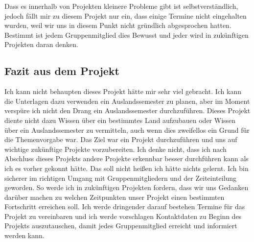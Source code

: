 \documentclass[11pt]{article}
\begin{document}
Dass es innerhalb von Projekten kleinere Probleme gibt ist selbstverständlich, jedoch fällt mir zu diesem Projekt nur ein, dass einige Termine nicht eingehalten wurden, weil wir uns in diesem Punkt nicht gründlich abgesprochen hatten. Bestimmt ist jedem Gruppenmitglied dies Bewusst und jeder wird in zukünftigen Projekten daran denken.



\subsection{Fazit aus dem Projekt}

Ich kann nicht behaupten dieses Projekt hätte mir sehr viel gebracht. Ich kann die Unterlagen dazu verwenden ein Auslandssemester zu planen, aber im Moment verspüre ich nicht den Drang ein Auslandssemester durchzuführen.  
Dieses Projekt diente nicht dazu Wissen über ein bestimmtes Land aufzubauen oder Wissen über ein Auslandssemester zu vermitteln, auch wenn dies zweifellos ein Grund für die Themenvorgabe war. Das Ziel war ein Projekt durchzuführen und uns auf wichtige zukünftige Projekte vorzubereiten. Ich denke nicht, dass ich nach Abschluss dieses Projekts andere Projekte erkennbar besser durchführen kann als ich es vorher gekonnt hätte.
Das soll nicht heißen ich hätte nichts gelernt. Ich bin sicherer im richtigen Umgang mit Gruppenmitgliedern und der Zeiteinteilung geworden. So werde ich in zukünftigen Projekten fordern, dass wir uns Gedanken darüber machen zu welchen Zeitpunkten unser Projekt einen bestimmten Fortschritt erreichen soll. Ich werde dringender darauf bestehen Termine für das Projekt zu vereinbaren und ich werde vorschlagen Kontaktdaten zu Beginn des Projekts auszutauschen, damit jedes Gruppenmitglied erreicht und informiert werden kann.
\end{document}

